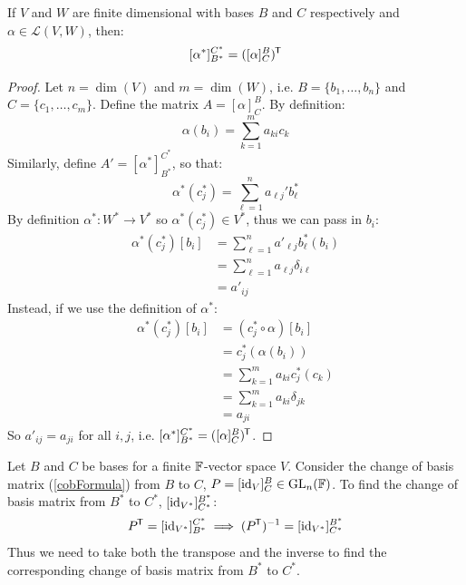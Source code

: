 \documentclass[../main.tex]{subfiles}
\begin{document}
\begin{proposition}
  If $V$ and $W$ are finite dimensional with bases $B$ and $C$ respectively and $\alpha \in \mathcal{L}(V, W)$, then: \label{starTrans}
  \[
    [\alpha^{*}]^{C^{*}}_{B^{*}} = ([\alpha]^{B}_{C})^{{\mkern-1.5mu\mathsf{T}}}
  \]
\end{proposition}
\begin{proof}
  Let $n = \dim(V)$ and $m = \dim(W)$, i.e. $B = \{b_1, \ldots, b_n\}$ and $C = \{c_1, \ldots, c_m\}$.
  Define the matrix $A = [\alpha]^{B}_{C}$.
  By definition:
  \[
    \alpha(b_i) = \sum_{k = 1}^{m} a_{k i}c_k
  \]
  Similarly, define $A' = [\alpha^{*}]^{C^{*}}_{B^{*}}$, so that:
  \[
    \alpha^{*}(c^{*}_j) = \sum_{\ell = 1}^{n} a_{\ell j}' b^{*}_{\ell}
  \]
  By definition $\alpha^{*}: W^{*} \to V^{*}$ so $\alpha^{*}(c^{*}_j) \in V^{*}$, thus we can pass in $b_i$:
  \begin{align*}
    \alpha^{*}(c^{*}_j)[b_i] &= \sum_{\ell = 1}^{n} a'_{\ell j} b^{*}_{\ell}(b_i) \\
                             &= \sum_{\ell = 1}^{n} a
                             _{\ell j} \delta_{i \ell} \\
                             &= a'_{i j}
  \end{align*}
  Instead, if we use the definition of $\alpha^{*}$:
  \begin{align*}
    \alpha^{*}(c^{*}_j)[b_i] &= (c^{*}_j \circ \alpha)[b_i] \\
                             &= c^{*}_j(\alpha(b_i)) \\
                             &= \sum_{k = 1}^{m} a_{k i} c^{*}_j(c_k) \\
                             &= \sum_{k = 1}^{m} a_{k i} \delta_{j k} \\
                             &= a_{j i}
  \end{align*}
  So $a'_{i j} = a_{j i}$ for all $i, j$, i.e. $[\alpha^{*}]^{C^{*}}_{B^{*}} = ([\alpha]^{B}_{C})^{{\mkern-1.5mu\mathsf{T}}}$.
\end{proof}
\begin{example}
  Let $B$ and $C$ be bases for a finite $\mathbb{F}$-vector space $V$.
  Consider the change of basis matrix (\cref{cobFormula}) from $B$ to $C$, $P = [\mathrm{id}_V]^{B}_{C} \in \mathrm{GL}_n(\mathbb{F})$.
  To find the change of basis matrix from $B^{*}$ to $C^{*}$, $[\mathrm{id}_{V^{*}}]^{B^{*}}_{C^{*}}$:
  \[
    P^{{\mkern-1.5mu\mathsf{T}}} = [\mathrm{id}_{V^{*}}]^{C^{*}}_{B^{*}} \implies (P^{{\mkern-1.5mu\mathsf{T}}})^{-1} =  [\mathrm{id}_{V^{*}}]^{B^{*}}_{C^{*}}
  \]
  Thus we need to take both the transpose and the inverse to find the corresponding change of basis matrix from $B^{*}$ to $C^{*}$.
\end{example}
\end{document}
